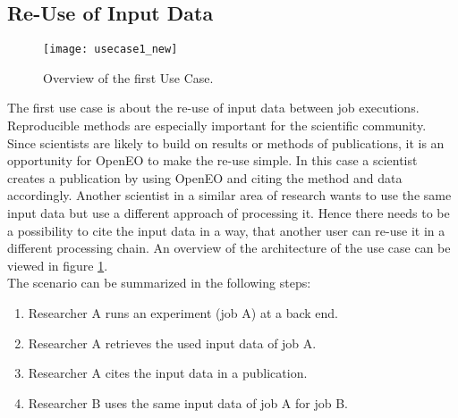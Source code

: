 \documentclass[draft,final]{vutinfth} %
\begin{document}
\subsection{Re-Use of Input Data}\label{UseCase1}
\begin{figure}[h]
	\centering
	\texttt{[image: usecase1\_new]}
	\caption{Overview of the first Use Case.}
	\label{fig:usecase1} %
\end{figure}
The first use case is about the re-use of input data between job executions. Reproducible methods are especially important for the scientific community. Since scientists are likely to build on results or methods of publications, it is an opportunity for OpenEO to make the re-use simple. In this case a scientist creates a publication by using OpenEO and citing the method and data accordingly. Another scientist in a similar area of research wants to use the same input data but use a different approach of processing it. Hence there needs to be a possibility to cite the input data in a way, that another user can re-use it in a different processing chain. 
An overview of the architecture of the use case can be viewed in figure \ref{fig:usecase1}. \\
The scenario can be summarized in the following steps: \\

\begin{enumerate}
	\item Researcher A runs an experiment (job A) at a back end.
	\item Researcher A retrieves the used input data of job A.
	\item Researcher A cites the input data in a publication.
	\item Researcher B uses the same input data of job A for job B.  
\end{enumerate}
\end{document}

